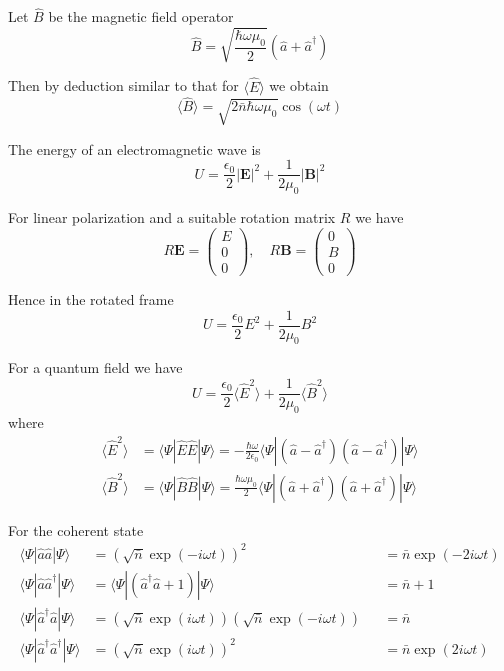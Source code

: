 \documentclass[12pt]{article}
\begin{document}
Let $\hat B$ be the magnetic field operator
\begin{equation*}
\hat B=\sqrt{\frac{\hbar\omega\mu_0}{2}}
(\hat a+\hat a^\dag)
\end{equation*}

Then by deduction similar to that for $\langle\hat E\rangle$ we obtain
\begin{equation*}
\langle\hat B\rangle=\sqrt{2\bar n\hbar\omega\mu_0}\cos(\omega t)
\end{equation*}

The energy of an electromagnetic wave is
\begin{equation*}
U=\frac{\epsilon_0}{2}|\mathbf E|^2+\frac{1}{2\mu_0}|\mathbf B|^2
\end{equation*}

For linear polarization and a suitable rotation matrix $R$ we have
\begin{equation*}
R\mathbf E=\begin{pmatrix}E\\0\\0\end{pmatrix},
\quad
R\mathbf B=\begin{pmatrix}0\\B\\0\end{pmatrix}
\end{equation*}

Hence in the rotated frame
\begin{equation*}
U=\frac{\epsilon_0}{2}E^2+\frac{1}{2\mu_0}B^2
\end{equation*}

For a quantum field we have
\begin{equation*}
U=\frac{\epsilon_0}{2}\langle\hat E^2\rangle+\frac{1}{2\mu_0}\langle\hat B^2\rangle
\end{equation*}
where
\begin{align*}
\langle\hat E^2\rangle
&=\langle\Psi|\hat E\hat E|\Psi\rangle
=-\frac{\hbar\omega}{2\epsilon_0}
\langle\Psi|(\hat a-\hat a^\dag)(\hat a-\hat a^\dag)|\Psi\rangle
\\
\langle\hat B^2\rangle
&=\langle\Psi|\hat B\hat B|\Psi\rangle
=\frac{\hbar\omega\mu_0}{2}
\langle\Psi|(\hat a+\hat a^\dag)(\hat a+\hat a^\dag)|\Psi\rangle
\end{align*}

For the coherent state
\begin{align*}
\langle\Psi|\hat a\hat a|\Psi\rangle&=\left(\sqrt{\bar n}\exp(-i\omega t)\right)^2
& &=\bar n\exp(-2i\omega t)
\\
\langle\Psi|\hat a\hat a^\dag|\Psi\rangle&=\langle\Psi|(\hat a^\dag\hat a+1)|\Psi\rangle
& &=\bar n+1
\\
\langle\Psi|\hat a^\dag\hat a|\Psi\rangle
&=\left(\sqrt{\bar n}\exp(i\omega t)\right)\left(\sqrt{\bar n}\exp(-i\omega t)\right)
& &=\bar n
\\
\langle\Psi|\hat a^\dag\hat a^\dag|\Psi\rangle&=\left(\sqrt{\bar n}\exp(i\omega t)\right)^2
& &=\bar n\exp(2i\omega t)
\end{align*}
\end{document}
